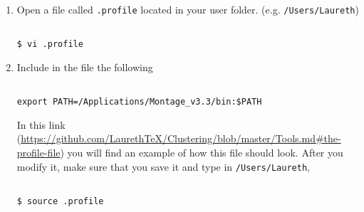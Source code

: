 \documentclass[11pt,fleqn]{book} %
\begin{document}
\begin{description}
																																																																																																																																							        \begin{enumerate}
																																																																																																																																								    	\item Open a file called \verb|.profile| located in your user folder. (e.g. \verb|/Users/Laureth|)
																																																																																																																																									        	\begin{verbatim}
																																																																																																																																											            	$ vi .profile
																																																																																																																																													            \end{verbatim}
																																																																																																																																														             \item Include in the file the following
																																																																																																																																															                \begin{verbatim}
																																																																																																																																																	           	export PATH=/Applications/Montage_v3.3/bin:$PATH
																																																																																																																																																			           \end{verbatim}
																																																																																																																																																				              In this link (\url{https://github.com/LaurethTeX/Clustering/blob/master/Tools.md#the-profile-file}) you will find an example of how this file should look. After you modify it, make sure that you save it and type in \verb|/Users/Laureth|,
																																																																																																																																																					                 \begin{verbatim}
																																																																																																																																																							            	$ source .profile

\end{verbatim}
\end{enumerate}
\end{description}
\end{document}
